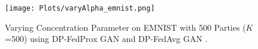 



\begin{figure}
 \centering
 \texttt{[image: Plots/varyAlpha\_emnist.png]}
	\caption{\small Varying Concentration Parameter on EMNIST with 500 Parties ($K$=500) using DP-FedProx GAN  and DP-FedAvg GAN .}
 \label{fig:varyAlpha_emnist}
\end{figure}












